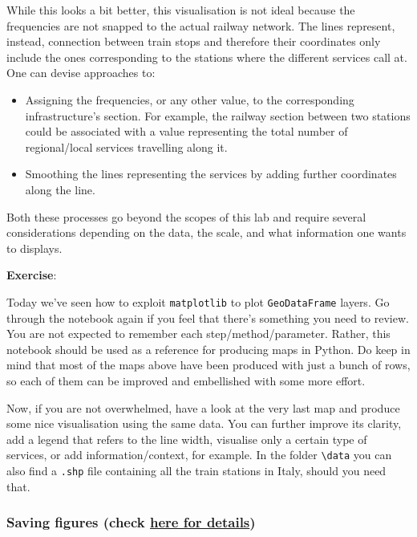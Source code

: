 \documentclass[
  letterpaper,
  DIV=11,
  numbers=noendperiod]{scrreprt}
\providecommand{\tightlist}{%
  \setlength{\itemsep}{0pt}\setlength{\parskip}{0pt}}\usepackage{longtable,booktabs,array}
\begin{document}
While this looks a bit better, this visualisation is not ideal because
the frequencies are not snapped to the actual railway network. The lines
represent, instead, connection between train stops and therefore their
coordinates only include the ones corresponding to the stations where
the different services call at. One can devise approaches to:

\begin{itemize}
\tightlist
\item
  Assigning the frequencies, or any other value, to the corresponding
  infrastructure's section. For example, the railway section between two
  stations could be associated with a value representing the total
  number of regional/local services travelling along it.
\item
  Smoothing the lines representing the services by adding further
  coordinates along the line.
\end{itemize}

Both these processes go beyond the scopes of this lab and require
several considerations depending on the data, the scale, and what
information one wants to displays.

\textbf{Exercise}:

Today we've seen how to exploit \texttt{matplotlib} to plot
\texttt{GeoDataFrame} layers. Go through the notebook again if you feel
that there's something you need to review. You are not expected to
remember each step/method/parameter. Rather, this notebook should be
used as a reference for producing maps in Python. Do keep in mind that
most of the maps above have been produced with just a bunch of rows, so
each of them can be improved and embellished with some more effort.

Now, if you are not overwhelmed, have a look at the very last map and
produce some nice visualisation using the same data. You can further
improve its clarity, add a legend that refers to the line width,
visualise only a certain type of services, or add information/context,
for example. In the folder \texttt{\textbackslash{}data} you can also
find a \texttt{.shp} file containing all the train stations in Italy,
should you need that.

\hypertarget{saving-figures-check-here-for-details}{%
\subsubsection{\texorpdfstring{Saving figures (check
\href{https://matplotlib.org/stable/api/_as_gen/matplotlib.pyplot.savefig.html}{here
for
details})}{Saving figures (check here for details)}}\label{saving-figures-check-here-for-details}}
\end{document}

